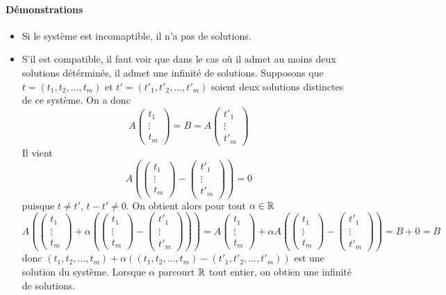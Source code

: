 \paragraph{Démonstrations}
\begin{itemize}
  \item Si le système est incomaptible, il n'a pas de solutions.
  \item S'il est compatible, il faut voir que dans le cas où il admet au moins deux solutions détérminés, il admet une infinité de solutions. Supposons que $t = (t_1, t_2, \ldots, t_m)$ et $t' = (t'_1, t'_2, \ldots, t'_m)$ soient deux solutions distinctes de ce système. On a donc
    $$A \begin{pmatrix} t_1 \\ \vdots \\ t_m \end{pmatrix} = B = A \begin{pmatrix} t'_1 \\ \vdots \\ t'_m \end{pmatrix}$$
    Il vient
    $$A \left( \begin{pmatrix} t_1 \\ \vdots \\ t_m \end{pmatrix} - \begin{pmatrix} t'_1 \\ \vdots \\ t'_m \end{pmatrix} \right) = 0$$
    puisque $t \neq t'$, $t - t' \neq 0$. On obtient alors pour tout $\alpha \in \mathbb{R}$
    $$A \left( \begin{pmatrix} t_1 \\ \vdots \\ t_m \end{pmatrix} + \alpha \left( \begin{pmatrix} t_1 \\ \vdots \\ t_m \end{pmatrix} - \begin{pmatrix} t'_1 \\ \vdots \\ t'_m \end{pmatrix} \right) \right) 
      = A \begin{pmatrix} t_1 \\ \vdots \\ t_m \end{pmatrix} + \alpha A \left( \begin{pmatrix} t_1 \\ \vdots \\ t_m \end{pmatrix} - \begin{pmatrix} t'_1 \\ \vdots \\ t'_m \end{pmatrix} \right) 
      = B + 0 = B$$
    donc $(t_1, t_2, \ldots, t_m) + \alpha ((t_1, t_2, \ldots, t_m) - (t'_1, t'_2, \ldots, t'_m))$ est une solution du système. Lorsque $\alpha$ parcourt $\mathbb{R}$ tout entier, on obtien une infinité de solutions.
\end{itemize}

